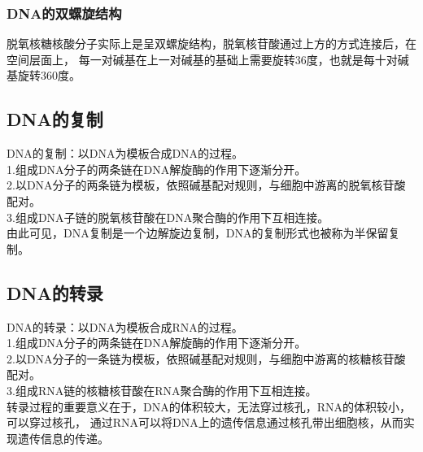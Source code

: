 \documentclass[UTF8]{ctexart}
\begin{document}
\subsubsection{DNA的双螺旋结构}
    脱氧核糖核酸分子实际上是呈双螺旋结构，脱氧核苷酸通过上方的方式连接后，在空间层面上，
    每一对碱基在上一对碱基的基础上需要旋转$36$度，也就是每十对碱基旋转$360$度。

\newpage

\subsection{DNA的复制}
    DNA的复制：以DNA为模板合成DNA的过程。\\[3mm]
    1.组成DNA分子的两条链在DNA解旋酶的作用下逐渐分开。\\[3mm]
    2.以DNA分子的两条链为模板，依照碱基配对规则，与细胞中游离的脱氧核苷酸配对。\\[3mm]
    3.组成DNA子链的脱氧核苷酸在DNA聚合酶的作用下互相连接。\\[6mm]
    由此可见，DNA复制是一个边解旋边复制，DNA的复制形式也被称为半保留复制。

\subsection{DNA的转录}
    DNA的转录：以DNA为模板合成RNA的过程。\\[3mm]
    1.组成DNA分子的两条链在DNA解旋酶的作用下逐渐分开。\\[3mm]
    2.以DNA分子的一条链为模板，依照碱基配对规则，与细胞中游离的核糖核苷酸配对。\\[3mm]
    3.组成RNA链的核糖核苷酸在RNA聚合酶的作用下互相连接。\\[6mm]
    转录过程的重要意义在于，DNA的体积较大，无法穿过核孔，RNA的体积较小，可以穿过核孔，
    通过RNA可以将DNA上的遗传信息通过核孔带出细胞核，从而实现遗传信息的传递。
\end{document}
